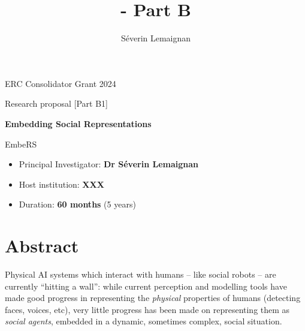 \documentclass[11pt,a4paper]{report}
\title{\project - Part B}
\author{Séverin Lemaignan}
\newcommand{\project}{EmbeRS\xspace}
\newcommand{\eu}[1]{}
\begin{document}
\maketitle

\begin{center}
    ERC Consolidator Grant 2024

    Research proposal [Part B1]

    \vspace{2cm}

    \textbf{\LARGE Embedding Social Representations}

    \vspace{2cm}
    {\Huge \project}

\end{center}

    \vspace{2cm}

\begin{itemize}
    \item Principal Investigator: \textbf{Dr Séverin Lemaignan}
    \item Host institution: \textbf{XXX}
    \item Duration: \textbf{60 months} (5 years)
\end{itemize}

\section*{Abstract}\label{abstract}

\eu{The abstract (summary) should, at a glance, provide the reader with a clear
understanding of the objectives of the research proposal and how they will be
achieved. The abstract will be used as the short description of your research
proposal in the evaluation process and in communications to contact in
particular the potential remote referees and/or inform the Commission and/or the
programme management committees and/or relevant national funding agencies
(provided you give permission to do so where requested in the online proposal
submission forms, section 1). It must therefore be short and precise and should
not contain confidential information. \\
Please use plain typed text, avoiding formulae and other special characters. The
abstract must be written in English. There is a limit of 2000 characters (spaces
and line breaks included).}


Physical AI systems which interact with humans -- like social robots -- are
currently ``hitting a wall'': while current perception and modelling tools have
made good progress in representing the \emph{physical} properties of humans (detecting
faces, voices, etc), very little progress has been made on representing them as
\emph{social agents}, embedded in a dynamic, sometimes complex, social situation.
\end{document}
